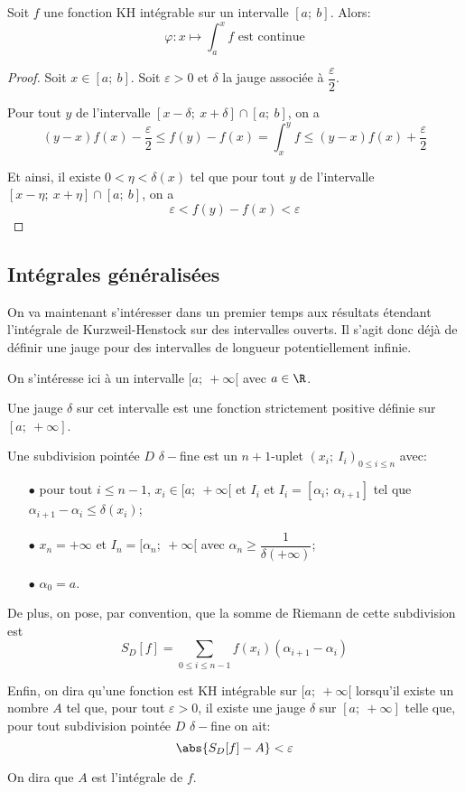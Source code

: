 \begin{cor}
Soit $f$ une fonction KH intégrable sur un intervalle $[a;~b]$. Alors:
\[
\varphi: x \mapsto \int_a^x f \text{ est continue}
\]
\end{cor}


\begin{proof}
Soit $x \in [a;~b]$. Soit $\varepsilon>0$ et $\delta$ la jauge associée à $\dfrac{\varepsilon}{2}$.

Pour tout $y$ de l'intervalle $[x-\delta;~x+\delta] \cap [a;~b]$, on a 
\[
(y-x)f(x) - \dfrac{\varepsilon}{2} \leq f(y)-f(x) = \int_x^y f \leq (y-x)f(x) + \dfrac{\varepsilon}{2}
\]

Et ainsi, il existe $0 < \eta < \delta(x)$ tel que pour tout $y$ de l'intervalle $[x-\eta;~x+\eta] \cap [a;~b]$, on a
\[
\varepsilon < f(y)-f(x) < \varepsilon
\]
\end{proof}

\subsection{Intégrales généralisées}

On va maintenant s'intéresser dans un premier temps aux résultats étendant l'intégrale de Kurzweil-Henstock sur des intervalles ouverts. Il s'agit donc déjà de définir une jauge pour des intervalles de longueur potentiellement infinie.

\begin{de}
On s'intéresse ici à un intervalle $[a;~+\infty[$ avec $a \in \R$. 

Une jauge $\delta$ sur cet intervalle est une fonction strictement positive définie sur $[a;~+\infty]$. 

Une subdivision pointée $D$ $\delta-$fine est un $n+1$-uplet $(x_i;~I_i)_{0 \leq i \leq n}$ avec:
\begin{itemize}
\item[$\bullet$]
pour tout $i \leq n-1$, $x_i \in [a;~+\infty[$ et $I_i$ et $I_i = [\alpha_i;~\alpha_{i+1}]$ tel que $\alpha_{i+1}-\alpha_i \leq \delta(x_i)$;
\item[$\bullet$]
$x_n = +\infty$ et $I_n = [\alpha_n;~+\infty[$ avec $\alpha_n \geq \dfrac{1}{\delta(+\infty)}$;
\item[$\bullet$]
$\alpha_0 = a$.
\end{itemize}


De plus, on pose, par convention, que la somme de Riemann de cette subdivision est 
\[
S_D[f] = \displaystyle{\sum \limits_{0 \leq i \leq n-1}} f(x_i) (\alpha_{i+1}-\alpha_i)
\]

Enfin, on dira qu'une fonction est KH intégrable sur $[a;~+\infty[$ lorsqu'il existe un nombre $A$ tel que, pour tout $\varepsilon>0$, il existe une jauge $\delta$ sur $[a;~+\infty]$ telle que, pour tout subdivision pointée $D$ $\delta-$fine on ait:
\[
\abs{S_D[f]-A} < \varepsilon
\]

On dira que $A$ est l'intégrale de $f$.
\end{de}

